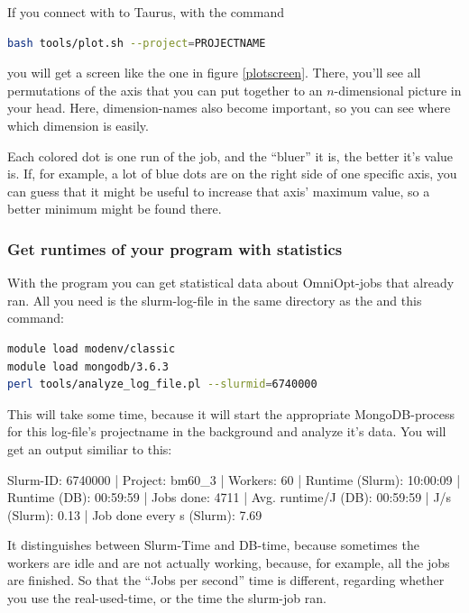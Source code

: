 \documentclass[]{scrartcl}
\begin{document}
If you connect with  to Taurus, with the command

\begin{lstlisting}[language=bash]
bash tools/plot.sh --project=PROJECTNAME
\end{lstlisting}

you will get a screen like the one in figure \ref{plotscreen}. There, you'll see all permutations of the axis that you can put together to
an $n$-dimensional picture in your head. Here, dimension-names also become important, so you can see where which dimension is easily. 

Each colored dot is one run of the job, and the ``bluer'' it is, the better it's value is. If, for example, a lot of blue dots are on the
right side of one specific axis, you can guess that it might be useful to increase that axis' maximum value, so a better minimum might be
found there.


\subsubsection{Get runtimes of your program with statistics}

With the program  you can get statistical data about OmniOpt-jobs that already ran.
All you need is the slurm-log-file in the same directory as the  and this command:

\begin{lstlisting}[language=bash]
module load modenv/classic
module load mongodb/3.6.3
perl tools/analyze_log_file.pl --slurmid=6740000
\end{lstlisting}

This will take some time, because it will start the appropriate MongoDB-process for this log-file's projectname
in the background and analyze it's data. You will get an output similiar to this:

\begin{cverbatim}
Slurm-ID: 6740000 | Project: bm60_3 | Workers: 60 | 
Runtime (Slurm): 10:00:09 | Runtime (DB): 00:59:59 | 
Jobs done: 4711 | Avg. runtime/J (DB): 00:59:59 | 
J/s (Slurm): 0.13 | Job done every s (Slurm): 7.69
\end{cverbatim}

It distinguishes between Slurm-Time and DB-time, because sometimes the workers are idle and are not actually working,
because, for example, all the jobs are finished. So that the ``Jobs per second'' time is different, regarding whether you
use the real-used-time, or the time the slurm-job ran.
\end{document}
